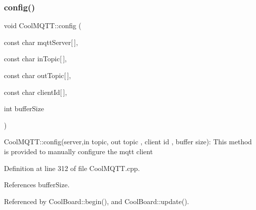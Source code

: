 \subsubsection{\texorpdfstring{config()}{config()}\hspace{0.1cm}{\footnotesize\ttfamily [1/2]}}
{\footnotesize\ttfamily void Cool\+M\+Q\+T\+T\+::config (\begin{DoxyParamCaption}\item[{const char}]{mqtt\+Server\mbox{[}$\,$\mbox{]},  }\item[{const char}]{in\+Topic\mbox{[}$\,$\mbox{]},  }\item[{const char}]{out\+Topic\mbox{[}$\,$\mbox{]},  }\item[{const char}]{client\+Id\mbox{[}$\,$\mbox{]},  }\item[{int}]{buffer\+Size }\end{DoxyParamCaption})}

Cool\+M\+Q\+T\+T\+::config(server,in topic, out topic , client id , buffer size)\+: This method is provided to manually configure the mqtt client 

Definition at line 312 of file Cool\+M\+Q\+T\+T.\+cpp.



References buffer\+Size.



Referenced by Cool\+Board\+::begin(), and Cool\+Board\+::update().


